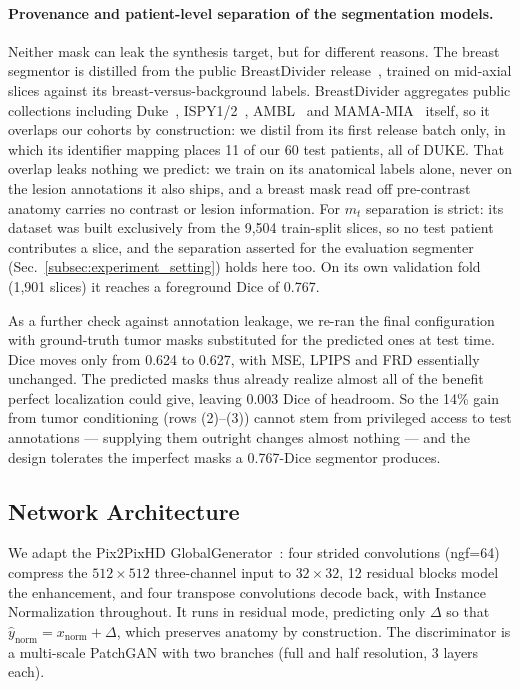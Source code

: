\documentclass[runningheads,a4paper]{llncs}
\begin{document}
\paragraph{Provenance and patient-level separation of the segmentation models.}
Neither mask can leak the synthesis target, but for different reasons. The breast segmentor is distilled from the public BreastDivider release~\cite{rokuss2025breastdivider}, trained on mid-axial slices against its breast-versus-background labels. BreastDivider aggregates public collections including Duke~\cite{saha2021duke}, ISPY1/2~\cite{newitt2016ispy1,li2022ispy2}, AMBL~\cite{ambl2024} and MAMA-MIA~\cite{muller2022mama} itself, so it overlaps our cohorts by construction: we distil from its first release batch only, in which its identifier mapping places 11 of our 60 test patients, all of DUKE. That overlap leaks nothing we predict: we train on its anatomical labels alone, never on the lesion annotations it also ships, and a breast mask read off pre-contrast anatomy carries no contrast or lesion information. For $m_t$ separation is strict: its dataset was built exclusively from the 9,504 train-split slices, so no test patient contributes a slice, and the separation asserted for the evaluation segmenter (Sec.~\ref{subsec:experiment_setting}) holds here too. On its own validation fold (1,901 slices) it reaches a foreground Dice of 0.767.


As a further check against annotation leakage, we re-ran the final configuration with ground-truth tumor masks substituted for the predicted ones at test time. Dice moves only from 0.624 to 0.627, with MSE, LPIPS and FRD essentially unchanged. The predicted masks thus already realize almost all of the benefit perfect localization could give, leaving 0.003 Dice of headroom. So the 14\% gain from tumor conditioning (rows (2)--(3)) cannot stem from privileged access to test annotations --- supplying them outright changes almost nothing --- and the design tolerates the imperfect masks a 0.767-Dice segmentor produces.

\subsection{Network Architecture}
We adapt the Pix2PixHD GlobalGenerator~\cite{wang2018pix2pixHD}: four strided convolutions (ngf=64) compress the $512 \times 512$ three-channel input to $32 \times 32$, 12 residual blocks model the enhancement, and four transpose convolutions decode back, with Instance Normalization throughout. It runs in residual mode, predicting only $\Delta$ so that $\hat{y}_{\text{norm}} = x_{\text{norm}} + \Delta$, which preserves anatomy by construction. The discriminator is a multi-scale PatchGAN with two branches (full and half resolution, 3 layers each).
\end{document}
